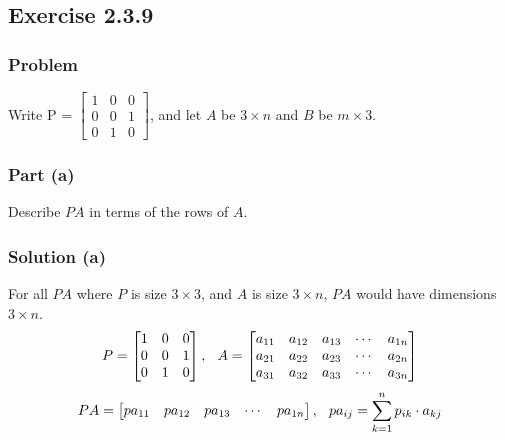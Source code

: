 \documentclass[12pt]{article}
\begin{document}
\subsection*{Exercise 2.3.9}
\vspace{0.25in}
\subsubsection*{Problem}
Write P = 
$\begin{bmatrix}
  1 & 0 & 0\\ 
  0 & 0 & 1\\ 
  0 & 1 & 0 
\end{bmatrix}$, 
and let $A$ be $3 \times n$ and $B$ be $m \times 3$. 
\vspace{0.25in}
\subsubsection*{Part (a)}
Describe $PA$ in terms of the rows of $A$. 
\vspace{0.25in}
\subsubsection*{Solution (a)}
For all $PA$ where $P$ is size $3 \times 3$, and $A$ is size $3 \times n$, $PA$ would have dimensions $3 \times n$.\\ 
\[
  P = 
  \begin{bmatrix}
    1 & 0 & 0\\ 
    0 & 0 & 1\\ 
    0 & 1 & 0 
  \end{bmatrix}
  ,\hspace{0.1in}
  A = 
  \begin{bmatrix}
    a_{11} & a_{12} & a_{13} & \cdots & a_{1n}\\ 
    a_{21} & a_{22} & a_{23} & \cdots & a_{2n}\\ 
    a_{31} & a_{32} & a_{33} & \cdots & a_{3n} 
  \end{bmatrix}
\]
\[
  PA = 
  \begin{bmatrix}
    pa_{11} & pa_{12} & pa_{13} & \cdots & pa_{1n} 

  \end{bmatrix}, \hspace{0.1in}
  pa_{ij} = \displaystyle\sum_{k = 1}^{n} p_{ik} \cdot a_{kj}
\]
\vspace{0.25in}
\end{document}
